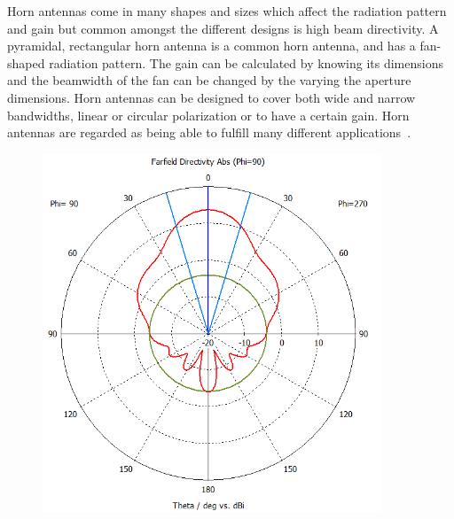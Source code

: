 Horn antennas come in many shapes and sizes which affect the radiation pattern and gain but common amongst the different designs is high beam directivity. A pyramidal, rectangular horn antenna is a common horn antenna, and has a fan-shaped radiation pattern. The gain can be calculated by knowing its dimensions and the beamwidth of the fan can be changed by the varying the aperture dimensions. Horn antennas can be designed to cover both wide and narrow bandwidths, linear or circular polarization or to have a certain gain. Horn antennas are regarded as being able to fulfill many different applications~\cite[p. 14.1-14.3]{ant_eng_hk}.  
\begin{figure}[H]
    \begin{minipage}{0.45\textwidth}
        \centering
        \includegraphics[width=0.9\textwidth]{figures/farfield (f=2.4) horn.png} %
    \end{minipage}\hfill
    \begin{minipage}{0.45\textwidth}
        \centering

\end{minipage}
\end{figure}
